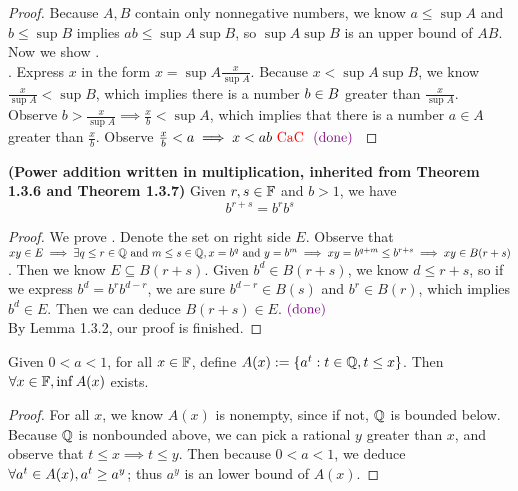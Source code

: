 \documentclass{report}
\begin{document}
\begin{proof}
Because $A,B$ contain only nonnegative numbers, we know $a\leq \sup A$ and $b\leq \sup B$ implies $ab\leq \sup A \sup B$, so $\sup A \sup B$ is an upper bound of $AB$. Now we show .\\

. Express $x$ in the form  $x=\sup A \frac{x}{\sup A}$. Because $x<\sup A \sup B$, we know $\frac{x}{\sup A}<\sup B$, which implies there is a number  $b\in B$ greater than $\frac{x}{\sup A}$. Observe $b>\frac{x}{\sup A}\implies \frac{x}{b}<\sup A$, which implies that there is a number $a\in A$ greater than  $\frac{x}{b}$. Observe  $\frac{x}{b}<a\implies x<ab \text{ \textcolor{red}{CaC} }\textcolor{violet}{\text{ (done) }}$  
\end{proof}
\begin{theorem}
\textbf{(Power addition written in multiplication, inherited from Theorem 1.3.6 and Theorem 1.3.7)} Given $r,s\in\mathbb{F}$ and $b>1$, we have
\begin{equation}
  b^{r+s}=b^rb^s
\end{equation}
\end{theorem}
\begin{proof}
We prove . Denote the set on right side $E$. Observe that $xy\in E \implies \exists q\leq r\in\mathbb{Q}\text{ and }m\leq s\in\mathbb{Q}, x=b^q\text{ and }y=b^m\implies xy=b^{q+m}\leq b^{r+s}\implies xy\in B(r+s)$. Then we know $E\subseteq B(r+s)$. Given $b^d\in B(r+s)$, we know $d\leq r+s$, so if we express $b^d=b^rb^{d-r}$, we are sure $b^{d-r}\in B(s)$ and $b^r\in B(r)$, which implies $b^d\in E$. Then we can deduce $B(r+s)\in E$.$\textcolor{violet}{\text{ (done) }}$\\

By Lemma 1.3.2, our proof is finished.
\end{proof}
\begin{lemma}
  Given $0<a<1$, for all $x\in\mathbb{F}$, define $A(x):=\{ a^t:t\in\mathbb{Q},t\leq x \}$. Then $\forall x\in\mathbb{F}, \inf A(x)$ exists.
\end{lemma}
\begin{proof}
For all $x$,  we know $A(x)$ is nonempty, since if not, $\mathbb{Q}$ is bounded below. Because $\mathbb{Q}$ is nonbounded above, we can pick a rational  $y$ greater than $x$, and observe that $t\leq x\implies t\leq y$. Then because $0<a<1$, we deduce  $\forall a^t\in A(x),a^t\geq a^y $; thus $a^y$ is an lower bound of  $A(x)$.      
\end{proof}
\end{document}
